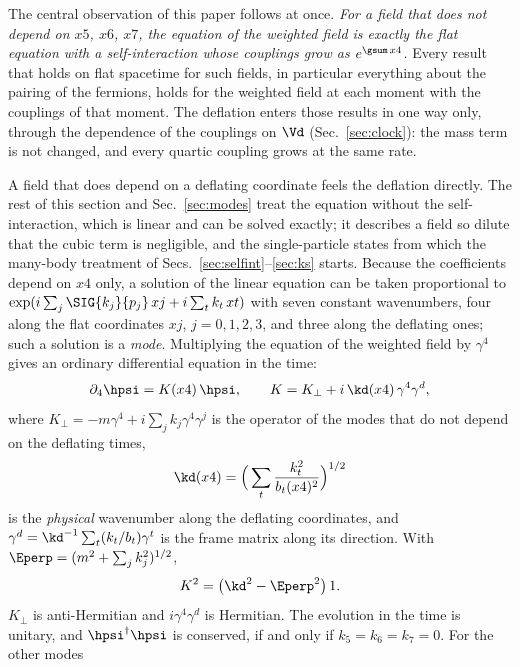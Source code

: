 The central observation of this paper follows at once. \emph{For a field that does not depend on
$x5$, $x6$, $x7$, the equation of the weighted field is exactly the flat equation with a
self-interaction whose couplings grow as $e^{\gsum\,x4}$.} Every result that holds on flat
spacetime for such fields, in particular everything about the pairing of the fermions, holds for
the weighted field at each moment with the couplings of that moment. The deflation enters those
results in one way only, through the dependence of the couplings on $\Vd$ (Sec.~\ref{sec:clock}):
the mass term is not changed, and every quartic coupling grows at the same rate.

A field that does depend on a deflating coordinate feels the deflation directly. The rest of this
section and Sec.~\ref{sec:modes} treat the equation without the self-interaction, which is linear
and can be solved exactly; it describes a field so dilute that the cubic term is negligible, and
the single-particle states from which the many-body treatment of
Secs.~\ref{sec:selfint}--\ref{sec:ks} starts. Because the
coefficients depend on $x4$ only, a solution of the linear equation can be taken proportional to
$\exp(i\sum_j\SIG{k_j}{p_j}\,xj+i\sum_tk_t\,xt)$ with seven constant wavenumbers, four along the flat
coordinates $xj$, $j=0,1,2,3$, and three along the deflating ones; such a solution is a \emph{mode}. Multiplying the equation of the weighted field by $\gamma^{4}$ gives an ordinary
differential equation in the time:
\begin{equation}
\partial_4\hpsi=K(x4)\,\hpsi,\qquad K=K_\perp+i\,\kd(x4)\,\gamma^{4}\gamma^{d},
\label{eq:K}
\end{equation}
where $K_\perp=-m\gamma^{4}+i\sum_jk_j\gamma^{4}\gamma^{j}$ is the operator of the modes that do not
depend on the deflating times,
\begin{equation}
\kd(x4)=\Big(\sum_t\frac{k_t^{2}}{b_t(x4)^{2}}\Big)^{1/2}
\label{eq:kd}
\end{equation}
is the \emph{physical} wavenumber along the deflating coordinates, and
$\gamma^{d}=\kd^{-1}\sum_t(k_t/b_t)\gamma^{t}$ is the frame matrix along its direction. With
$\Eperp=(m^{2}+\sum_jk_j^{2})^{1/2}$,
\begin{equation}
K^{2}=\big(\kd^{2}-\Eperp^{2}\big)\,1 .
\label{eq:K2}
\end{equation}
$K_\perp$ is anti-Hermitian and $i\gamma^{4}\gamma^{d}$ is Hermitian. The evolution in the time is
unitary, and $\hpsi^\dagger\hpsi$ is conserved, if and only if $k_5=k_6=k_7=0$. For the other modes
